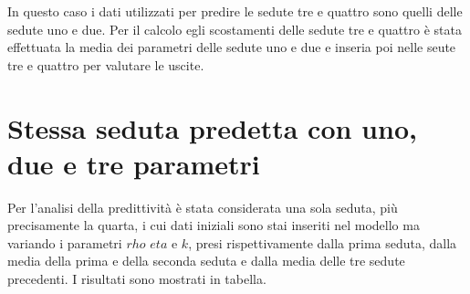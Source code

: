 \documentclass[10pt,twoside]{book}
\begin{document}
In questo caso i dati utilizzati per predire le sedute tre e quattro sono quelli delle sedute uno e due. Per il calcolo egli scostamenti delle sedute tre e quattro è stata effettuata la media dei parametri delle sedute uno e due e inseria poi nelle seute tre e quattro per valutare le uscite.
\section{Stessa seduta predetta con uno, due e tre parametri} 
Per l'analisi della predittività è stata considerata una sola seduta, più precisamente la quarta, i cui dati iniziali sono stai inseriti nel modello ma variando i parametri $rho$ $eta$ e $k$, presi rispettivamente dalla prima seduta, dalla media della prima e della seconda seduta e dalla media delle tre sedute precedenti. I risultati sono mostrati in tabella.
\end{document}
